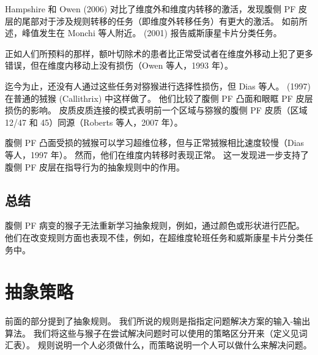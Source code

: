 Hampshire 和 Owen (2006) 对比了维度外和维度内转移的激活，发现腹侧 PF 皮层的尾部对于涉及规则转移的任务（即维度外转移任务）有更大的激活。 
如前所述，峰值发生在 Monchi 等人附近。 (2001) 报告威斯康星卡片分类任务。
\par
正如人们所预料的那样，额叶切除术的患者比正常受试者在维度外移动上犯了更多错误，但在维度内移动上没有损伤（Owen 等人，1993 年）。
\par
迄今为止，还没有人通过这些任务对猕猴进行选择性损伤，但 Dias 等人。 (1997) 在普通的狨猴 (Callithrix) 中这样做了。 
他们比较了腹侧 PF 凸面和眼眶 PF 皮层损伤的影响。 
皮质皮质连接的模式表明前一个区域与猕猴的腹侧 PF 皮质（区域 12/47 和 45）同源（Roberts 等人，2007 年）。
\par
腹侧 PF 凸面受损的狨猴可以学习超维位移，但与正常狨猴相比速度较慢（Dias 等人，1997 年）。 
然而，他们在维度内转移时表现正常。 
这一发现进一步支持了腹侧 PF 皮层在指导行为的抽象规则中的作用。
\subsection{总结}
\par
腹侧 PF 病变的猴子无法重新学习抽象规则，例如，通过颜色或形状进行匹配。 
他们在改变规则方面也表现不佳，例如，在超维度轮班任务和威斯康星卡片分类任务中。
\section{抽象策略}
\par 
前面的部分提到了抽象规则。 我们所说的规则是指指定问题解决方案的输入-输出算法。 
我们将这些与猴子在尝试解决问题时可以使用的策略区分开来（定义见词汇表）。 
规则说明一个人必须做什么，而策略说明一个人可以做什么来解决问题。
\par 

